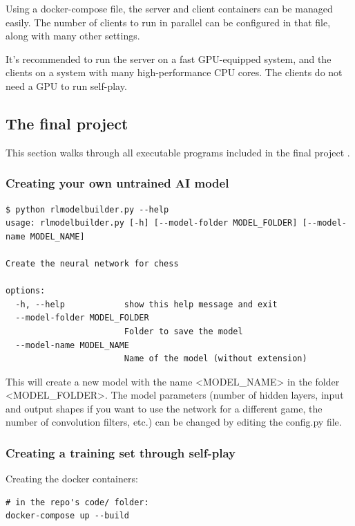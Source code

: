 \documentclass{article}
\begin{document}
Using a docker-compose file, the server and client containers can be managed easily. The number of clients 
to run in parallel can be configured in that file, along with many other settings.

It's recommended to run the server on a fast GPU-equipped system, and the clients on a system with many high-performance CPU cores.
The clients do not need a GPU to run self-play.

\subsection{The final project}

This section walks through all executable programs included in the final project \cite{zjefferChessEngineDeep2022}.

\subsubsection{Creating your own untrained AI model}

\begin{verbatim}
$ python rlmodelbuilder.py --help
usage: rlmodelbuilder.py [-h] [--model-folder MODEL_FOLDER] [--model-name MODEL_NAME]

Create the neural network for chess

options:
  -h, --help            show this help message and exit
  --model-folder MODEL_FOLDER
                        Folder to save the model
  --model-name MODEL_NAME
                        Name of the model (without extension)
\end{verbatim}

This will create a new model with the name <MODEL\_NAME> in the folder <MODEL\_FOLDER>.
The model parameters (number of hidden layers, input and output shapes if you want to use the network for a different game, the number of convolution filters, etc.)
can be changed by editing the config.py file.

\subsubsection{Creating a training set through self-play}

Creating the docker containers:

\begin{verbatim}
# in the repo's code/ folder:
docker-compose up --build
\end{verbatim}
\end{document}

